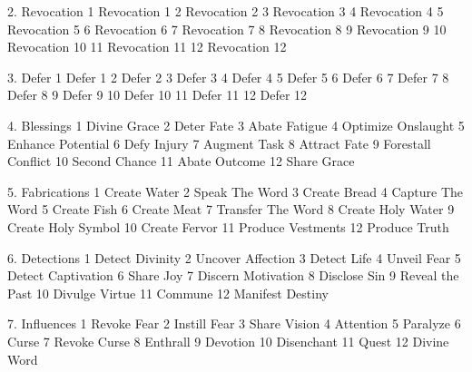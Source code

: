 2. Revocation
1 Revocation 1
2 Revocation 2
3 Revocation 3
4 Revocation 4
5 Revocation 5
6 Revocation 6
7 Revocation 7
8 Revocation 8
9 Revocation 9
10 Revocation 10
11 Revocation 11
12 Revocation 12

3. Defer
1 Defer 1
2 Defer 2
3 Defer 3
4 Defer 4
5 Defer 5
6 Defer 6
7 Defer 7
8 Defer 8
9 Defer 9
10 Defer 10
11 Defer 11
12 Defer 12

4. Blessings
1 Divine Grace
2 Deter Fate
3 Abate Fatigue
4 Optimize Onslaught
5 Enhance Potential
6 Defy Injury
7 Augment Task
8 Attract Fate
9 Forestall Conflict
10 Second Chance
11 Abate Outcome
12 Share Grace

5. Fabrications
1 Create Water
2 Speak The Word
3 Create Bread
4 Capture The Word
5 Create Fish
6 Create Meat
7 Transfer The Word
8 Create Holy Water
9 Create Holy Symbol
10 Create Fervor
11 Produce Vestments
12 Produce Truth

6. Detections
1 Detect Divinity
2 Uncover Affection
3 Detect Life
4 Unveil Fear
5 Detect Captivation
6 Share Joy
7 Discern Motivation
8 Disclose Sin
9 Reveal the Past
10 Divulge Virtue
11 Commune
12 Manifest Destiny

7. Influences
1 Revoke Fear
2 Instill Fear
3 Share Vision
4 Attention
5 Paralyze
6 Curse
7 Revoke Curse
8 Enthrall
9 Devotion
10 Disenchant
11 Quest
12 Divine Word